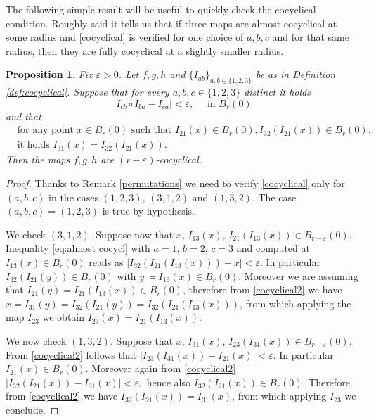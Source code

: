 \documentclass[11pt]{article}
\newcommand{\eps}{\varepsilon}
\theoremstyle{plain}
\newtheorem{prop}[theorem]{Proposition}
\theoremstyle{definition}
\numberwithin{equation}{section}
\begin{document}
The following simple result will be useful to quickly check the cocyclical condition. Roughly said it tells us that if three maps are almost cocyclical at some radius and \eqref{cocyclical} is verified  for one choice of $a,b,c$ and for that same radius, then they are fully cocyclical at a slightly smaller radius.
\begin{prop}\label{prop:trick}
	Fix $\eps>0$. Let $f,g,h$ and  $\{I_{ab}\}_{a,b \in \{1,2,3\}}$ be as in Definition \ref{def:cocyclical}. Suppose that for every $a,b,c \in \{1,2,3\}$ distinct it holds
 \begin{equation}\label{eq:almost cocycl}
     |I_{cb}\circ I_{ba}-I_{ca}|< \eps , \quad \text{ in } B_r(0)
 \end{equation}
and that
	\begin{equation}\label{cocyclical2}
		\begin{split}
			&\text{for any point } x \in B_r(0) \text{ such that } I_{21}(x)\in B_r(0), I_{32}(I_{21}(x)) \in B_r(0), \\
			&\text{it holds } I_{31}(x)=I_{32}(I_{21}(x)).
		\end{split}	
	\end{equation}
Then the maps $f,g,h$ are $(r-\eps)$-cocyclical.
\end{prop}
\begin{proof}
	Thanks to Remark \ref{permutations} we need to verify \eqref{cocyclical} only for $(a,b,c)$ in the cases $(1,2,3)$, $(3,1,2)$ and $(1,3,2).$ The case $(a,b,c)=(1,2,3)$ is true by hypothesis.
	
We check $(3,1,2).$	Suppose now that $x,\, I_{13}(x), \, I_{21}(I_{13}(x)) \in B_{r-\eps}(0)$. Inequality \eqref{eq:almost cocycl}  with $a=1$, $b=2$, $c=3$ and computed at $I_{13}(x)\in B_r(0)$ reads as $
	| I_{32}(I_{21}(I_{13}(x)))-x|<\eps.$
In particular $I_{32}(I_{21}(y)) \in B_r(0)$ with $y\coloneqq I_{13}(x) \in B_r(0)$. Moreover we are assuming that $I_{21}(y)=I_{21}(I_{13}(x))\in B_r(0) $, therefore from \eqref{cocyclical2} we have $x=I_{31}(y)=I_{32}(I_{21}(y))=I_{32}(I_{21}(I_{13}(x)))$, from which applying the map $I_{23}$ we obtain $I_{23}(x)=I_{21}(I_{13}(x)).$ 

	We now check $(1,3,2).$ Suppose  that $x,\, I_{31}(x), \, I_{23}(I_{31}(x)) \in B_{r-\eps}(0)$. From \eqref{cocyclical2} follows that 
	$
	|  I_{23}(I_{31}(x))-I_{21}(x)|<\eps.
	$
	In particular $I_{21}(x) \in B_r(0)$. Moreover again from \eqref{cocyclical2} $|  I_{32}(I_{21}(x))-I_{31}(x)|<\eps,$ hence also $I_{32}(I_{21}(x)) \in B_r(0)$. Therefore from \eqref{cocyclical2} we have $I_{32}(I_{21}(x))=I_{31}(x)$, from which applying $I_{23}$ we conclude.
\end{proof}
\end{document}
